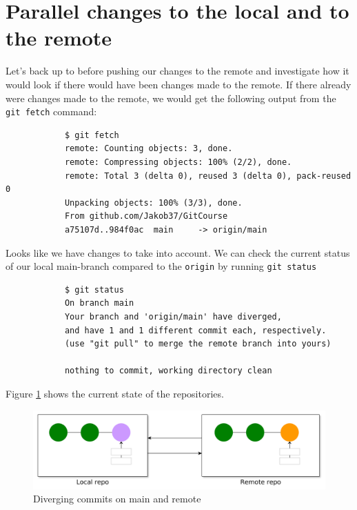 \documentclass[../main/git_course_main.tex]{subfiles}
\begin{document}
	\section{Parallel changes to the local and to the remote}
	
	
	Let's back up to before pushing our changes to the remote and investigate how it would look if there would have been changes made to the remote. If there already were changes made to the remote, we would get the following output from the \verb$git fetch$ command:
	
	\begin{codebox}
		\begin{lstlisting}
			$ git fetch
			remote: Counting objects: 3, done.
			remote: Compressing objects: 100% (2/2), done.
			remote: Total 3 (delta 0), reused 3 (delta 0), pack-reused 0
			Unpacking objects: 100% (3/3), done.
			From github.com/Jakob37/GitCourse
			a75107d..984f0ac  main     -> origin/main
		\end{lstlisting}
	\end{codebox}
	
	Looks like we have changes to take into account. We can check the current status of our local main-branch compared to the \verb$origin$ by running \verb$git status$
	
	\begin{codebox}
		\begin{lstlisting}
			$ git status
			On branch main
			Your branch and 'origin/main' have diverged,
			and have 1 and 1 different commit each, respectively.
			(use "git pull" to merge the remote branch into yours)
			
			nothing to commit, working directory clean
		\end{lstlisting}
	\end{codebox}
	
	Figure \ref{fig:diverged_remote} shows the current state of the repositories.
	
	\begin{figure}[h!]
		\centering
		\includegraphics[width=1.0\textwidth]{../visualizations/chapter5/55_diverging_commits.pdf}
		\caption{Diverging commits on main and remote}
		\label{fig:diverged_remote}
	\end{figure}
	
\end{document}
